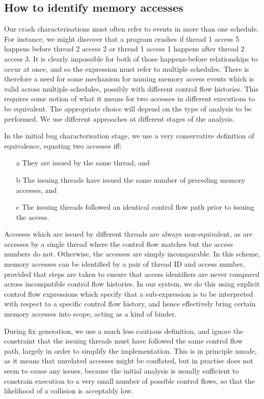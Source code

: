 \documentclass[10pt,a4paper,twocolumn]{article}
\begin{document}
\subsection{How to identify memory accesses}

Our crash characterisations must often refer to events in more than
one schedule.  For instance, we might discover that a program crashes
if thread 1 access 5 happens before thread 2 access 2 or thread 1
access 1 happens after thread 2 access 3.  It is clearly impossible
for both of those happens-before relationships to occur at once, and
so the expression must refer to multiple schedules.  There is
therefore a need for some mechanism for naming memory access events
which is valid across multiple schedules, possibly with different
control flow histories.  This requires some notion of what it means
for two accesses in different executions to be equivalent.  The
appropriate choice will depend on the type of analysis to be
performed.  We use different approaches at different stages of the
analysis.

In the initial bug characterisation stage, we use a very conservative
definition of equivalence, equating two accesses iff:

\begin{itemize}
\item[a] They are issued by the same thread, and
\item[b] The issuing threads have issued the same number of preceding
  memory accesses, and
\item[c] The issuing threads followed an identical control flow path
  prior to issuing the access.
\end{itemize}

Accesses which are issued by different threads are always
non-equivalent, as are accesses by a single thread where the control
flow matches but the access numbers do not.  Otherwise, the accesses
are simply incomparable.  In this scheme, memory accesses can be
identified by a pair of thread ID and access number, provided that
steps are taken to ensure that access identifiers are never compared
across incompatible control flow histories.  In our system, we do this
using explicit control flow expressions which specify that a
sub-expression is to be interpreted with respect to a specific control
flow history, and hence effectively bring certain memory accesses into
scope, acting as a kind of binder.

During fix generation, we use a much less cautious definition, and
ignore the constraint that the issuing threads must have followed the
same control flow path, largely in order to simplify the
implementation.  This is in principle unsafe, as it means that
unrelated accesses might be conflated, but in practise does not seem
to cause any issues, because the initial analysis is usually
sufficient to constrain execution to a very small number of possible
control flows, so that the likelihood of a collision is acceptably
low.
\end{document}
